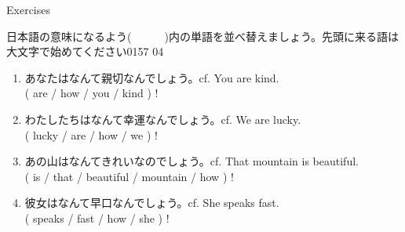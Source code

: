 \documentclass[aspectratio=169,xcolor={dvipsnames,table}]{beamer}
\begin{document}
\begin{frame}[plain]{Exercises}

  {\small 日本語の意味になるよう(~~~~~~)内の単語を並べ替えましょう。先頭に来る語は大文字で始めてください}\hfill{\tiny 0157}\,{\scriptsize {}}\,{\tiny 04}

  \begin{enumerate}
    \item あなたはなんて親切なんでしょう。\hfill{\scriptsize cf. You are kind.}\\
          ( are / how / you / kind ) !\\
    \item わたしたちはなんて幸運なんでしょう。\hfill{\scriptsize cf. We are lucky.}\\
          ( lucky / are / how / we ) !\\
    \item あの山はなんてきれいなのでしょう。\hfill{\scriptsize cf. That mountain is beautiful.}\\
          ( is / that / beautiful / mountain / how ) !\\
    \item 彼女はなんて早口なんでしょう。\hfill{\scriptsize cf. She speaks fast.}\\
          ( speaks / fast / how / she ) !\\
  \end{enumerate}

\end{frame}
\end{document}
